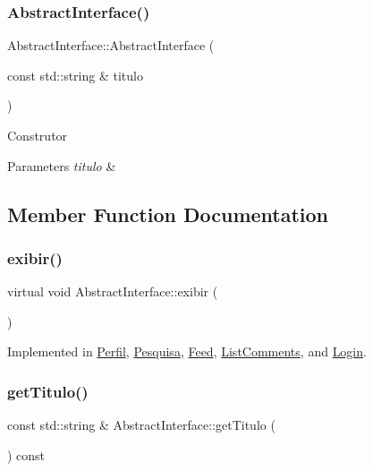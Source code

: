 \subsubsection{\texorpdfstring{Abstract\+Interface()}{AbstractInterface()}}
{\footnotesize\ttfamily Abstract\+Interface\+::\+Abstract\+Interface (\begin{DoxyParamCaption}\item[{const std\+::string \&}]{titulo }\end{DoxyParamCaption})}

Construtor 
\begin{DoxyParams}{Parameters}
{\em titulo} & \\
\hline
\end{DoxyParams}


\subsection{Member Function Documentation}
\mbox{\label{class_abstract_interface_a1d5d2a15e6e640bd0190a835cb64e5ed}} 
\subsubsection{\texorpdfstring{exibir()}{exibir()}}
{\footnotesize\ttfamily virtual void Abstract\+Interface\+::exibir (\begin{DoxyParamCaption}{ }\end{DoxyParamCaption})\hspace{0.3cm}{\ttfamily [pure virtual]}}



Implemented in \hyperlink{class_perfil_a877aaf12fcb8e429244f4754bc2657e0}{Perfil}, \hyperlink{class_pesquisa_a6184f213f4535f9c39900e6f41f05277}{Pesquisa}, \hyperlink{class_feed_abc572553a07c93e0ff4c690b210d4c06}{Feed}, \hyperlink{class_list_comments_ae1944d4065ee2d2954ee8cdefc17a2bf}{List\+Comments}, and \hyperlink{class_login_a9396a20329d6ef8ef14bc84bb4f09f92}{Login}.

\mbox{\label{class_abstract_interface_a6384dbdd6913f2b4cf9fb8005a87e7df}} 
\subsubsection{\texorpdfstring{get\+Titulo()}{getTitulo()}}
{\footnotesize\ttfamily const std\+::string \& Abstract\+Interface\+::get\+Titulo (\begin{DoxyParamCaption}{ }\end{DoxyParamCaption}) const}


